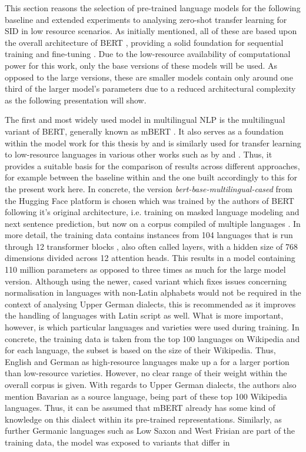 \documentclass[11pt,a4paper,twoside,openright]{scrbook}
\begin{document}
This section reasons the selection of pre-trained language models for the following baseline and extended experiments to analysing zero-shot transfer learning for SID in low resource scenarios. As initially mentioned, all of these are based upon the overall architecture of BERT \citep{devlin-etal-2019-bert}, providing a solid foundation for sequential training and fine-tuning \citep{clark-etal-2019-boolq}. Due to the low-resource availability of computational power for this work, only the base versions of these models will be used. As opposed to the large versions, these are smaller models contain only around one third of the larger model's parameters due to a reduced architectural complexity as the following presentation will show. 

The first and most widely used model in multilingual NLP is the multilingual variant of BERT, generally known as mBERT \citep{devlin-etal-2019-bert}. It also serves as a foundation within the model work for this thesis by \citet{van-der-goot-etal-2021-masked} and is similarly used for transfer learning to low-resource languages in various other works such as by \citet{hedderich-etal-2020-transfer} and \citet{kwon-etal-2023-sidlr}. Thus, it provides a suitable basis for the comparison of results across different approaches, for example between the baseline within \citet{van-der-goot-etal-2021-masked} and the one built accordingly to this for the present work here. In concrete, the version \textit{bert-base-multilingual-cased} from the Hugging Face platform is chosen which was trained by the authors of BERT following it's original architecture, i.e. training on masked language modeling and next sentence prediction, but now on a corpus compiled of multiple languages \citep{devlin-etal-2019-bert}. In more detail, the training data contains instances from 104 languages that is run through 12 transformer blocks \citep{vaswani_attention}, also often called layers, with a hidden size of 768 dimensions divided across 12 attention heads. This results in a model containing 110 million parameters as opposed to three times as much for the large model version. Although using the newer, cased variant which fixes issues concerning normalisation in languages with non-Latin alphabets would not be required in the context of analysing Upper German dialects, this is recommended as it improves the handling of languages with Latin script as well. What is more important, however, is which particular languages and varieties were used during training. In concrete, the training data is taken from the top 100 languages on Wikipedia and for each language, the subset is based on the size of their Wikipedia. Thus, English and German as high-resource languages make up a for a larger portion than low-resource varieties. However, no clear range of their weight within the overall corpus is given. With regards to Upper German dialects, the authors also mention Bavarian as a source language, being part of these top 100 Wikipedia languages. Thus, it can be assumed that mBERT already has some kind of knowledge on this dialect within its pre-trained representations. Similarly, as further Germanic languages such as Low Saxon and West Frisian are part of the training data, the model was exposed to variants that differ in 
\end{document}
